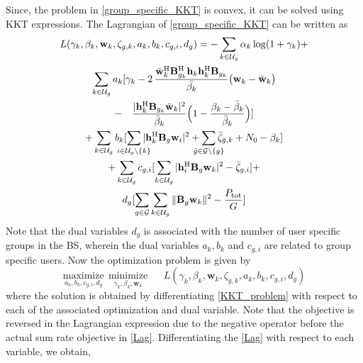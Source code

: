 \documentclass[letterpaper,conference,10pt]{IEEEtran}
\begin{document}
	Since, the problem in \eqref{group_specific_KKT} is convex, it can be solved using \ac{KKT} expressions. The Lagrangian of \eqref{group_specific_KKT} can be written as
	\begin{multline}\label{Lag}
	 L(\gamma_k, \beta_k, \mathbf{w}_k, \zeta_{g,k}, a_k, b_k, c_{g,i}, d_g) = -\sum_{k \in \mc{U}_g} \alpha_k \log({1 + \gamma_{k}}) +  \\  \sum_{k \in \mathcal{U}_g} a_k  [ \gamma_k - 2 \, \dfrac{\bar{\mathbf{w}}_{k}^{ \herm} \mbf{B}^{\herm}_{g_k} \mbf{h}_{k} \mbf{h}_{k}^{\herm} \mbf{B}_{g_k}}{\bar{\beta_k}} \big( \mathbf{w}_{k} - \bar{\mathbf{w}}_{k} \big)  \\
	 - \quad \dfrac{|\mathbf{h}_{k}^{\herm} \mathbf{B}_{g_k} \bar{\mathbf{w}}_{k}|^2}{\bar{\beta}_{k}} \Big( 1 - \dfrac{\beta_{k} - \bar{\beta}_{k}}{\bar{\beta}_{k}} \Big)] \\ + \sum_{k \in \mathcal{U}_g} b_k [  \sum_{\mathclap{i \in \mathcal{U}_{g}\backslash \{k\} }} | \mathbf{h}_{k}^{\herm} \mathbf{B}_g \mathbf{w}_{i} |^2  + \sum_{\mathclap{\bar{g} \in {\mathcal{{G}}} \backslash \{g\}}} \bar{\zeta}_{\bar{g},k} + N_0  - \beta_k] \\ + \sum_{k \in \mathcal{U}_g} c_{g,i}[ \sum_{\substack{k \in \mathcal{U}_{{g}}}} | \mathbf{h}_{i}^{\herm} \mathbf{B}_{{g}} \mathbf{w}_{k} |^2 - \bar{\zeta}_{{g},i} ] + \\ d_g [\sum_{g \in \mathcal{G}}\sum_{k \in \mathcal{U}_g} \|\mathbf{B}_g\mathbf{w}_{k} \|^2 - \frac{P_{\mrm{tot}}}{G}]
	\end{multline}
	Note that the dual variables $d_g$ is associated with the number of user specific groups in the \ac{BS}, wherein the dual variables $a_k, b_k$ and $c_{g,i}$ are related to group specific users. Now the optimization problem is given by
	\begin{equation} \label{KKT_problem}
			\underset{a_{k}, b_{k}, c_{g,i}, d_g} {\text{maximize}} \, \;	\underset{\gamma_{k}, \beta_{k}, \mathbf{w}_{k}} {\text{minimize}} \, \, \quad \; L(\gamma_k, \beta_k, \mathbf{w}_k, \zeta_{g,k}, a_k, b_k, c_{g,i}, d_g)
	\end{equation} 
	where the solution is obtained by differentiating \eqref{KKT_problem} with respect to each of the associated optimization and dual variable. Note that the objective is reversed in the Lagrangian expression due to the negative operator before the actual sum rate objective in \eqref{Lag}.	Differentiating the \eqref{Lag} with respect to each variable, we obtain,
\end{document}
